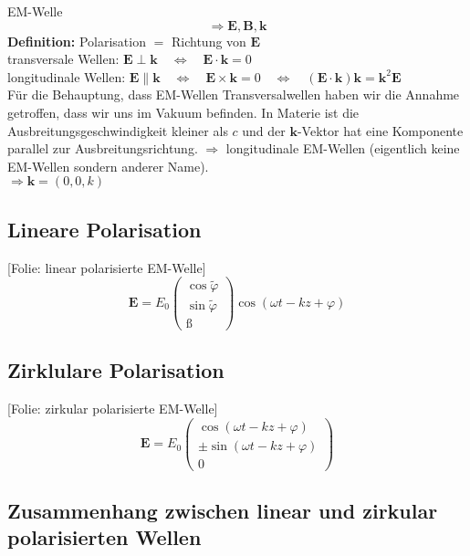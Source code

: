 \documentclass[titlepage,11pt,a4paper,ngerman]{report}
\newcommand{\folie}[1]{\color{gray}[Folie: #1]\color{black}}
\renewcommand{\vec}[1]{\boldsymbol{#1}}
\newcommand{\lcom}[1]{\color{MidnightBlue}#1\color{black}}
\begin{document}
EM-Welle
\begin{equation*}
\Rightarrow \vec{E},\vec{B},\vec{k}
\end{equation*}
\textbf{Definition: } Polarisation $ \widehat{=} $ Richtung von $ \vec{E} $\\
transversale Wellen: $ \vec{E} \perp \vec{k} \quad \Leftrightarrow \quad \vec{E} \cdot \vec{k} = 0 $\\
longitudinale Wellen: $ \vec{E} \parallel \vec{k} \quad \Leftrightarrow \quad \vec{E} \times \vec{k} = 0 \quad \Leftrightarrow \quad \left(\vec{E} \cdot \vec{k}\right) \vec{k} = \vec{k}^2 \vec{E} $\\
\lcom{Für die Behauptung, dass EM-Wellen Transversalwellen haben wir die Annahme getroffen, dass wir uns im Vakuum befinden. In Materie ist die Ausbreitungsgeschwindigkeit kleiner als $ c $ und der $ \vec{k} $-Vektor hat eine Komponente parallel zur Ausbreitungsrichtung. $ \Rightarrow $ longitudinale EM-Wellen (eigentlich keine EM-Wellen sondern anderer Name).}\\
$ \Rightarrow \vec{k} = (0,0,k) $

\subsection{Lineare Polarisation}

\folie{linear polarisierte EM-Welle}
\begin{equation*}
\vec{E} = E_0 \begin{pmatrix}
\cos \tilde{\varphi} \\ \sin \tilde{\varphi} \\ ß
\end{pmatrix} \cos \left(\omega t - k z + \varphi \right)
\end{equation*}

\subsection{Zirklulare Polarisation}

\folie{zirkular polarisierte EM-Welle}
\begin{equation*}
\vec{E} = E_0 \begin{pmatrix}
\cos \left(\omega t - kz + \varphi \right) \\ \pm\sin\left(\omega t - k z + \varphi\right) \\ 0
\end{pmatrix}
\end{equation*}

\subsection{Zusammenhang zwischen linear und zirkular polarisierten Wellen}
\end{document}
